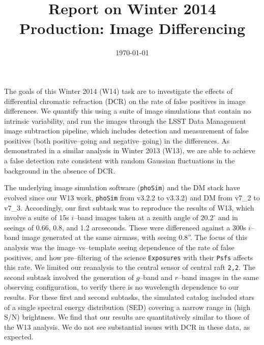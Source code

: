 \documentclass[prd, nofootinbib, floatfix, 11pt, tightenlines, times]{article}
\title{\vspace{-22mm} \Large{Report on Winter 2014 Production: Image Differencing} \vspace{-6mm}}
\date{\today}
\author{
}
\begin{document}
\maketitle

The goals of this Winter 2014 (W14) task are to investigate the
effects of differential chromatic refraction (DCR) on the rate of
false positives in image differences.  We quantify this using a suite
of image simulations that contain no intrinsic variability, and run
the images through the LSST Data Management image subtraction
pipeline, which includes detection and measurement of false positives
(both positive--going and negative--going) in the differences.  As
demonstrated in a similar analysis in Winter 2013 (W13), we are able
to achieve a false detection rate consistent with random Gaussian
fluctuations in the background in the absence of DCR.

The underlying image simulation software ({\tt phoSim}) and the DM
stack have evolved since our W13 work, {\tt phoSim} from v3.2.2 to
v3.3.2) and DM from v7\_2 to v7\_3.  Accordingly, our first subtask
was to reproduce the results of W13, which involve a suite of 15s
$i$--band images taken at a zenith angle of $20.2^{\circ}$ and in
seeings of 0.66, 0.8, and 1.2 arcseconds.  These were differenced
against a 300s $i$--band image generated at the same airmass, with
seeing 0.8''.  The focus of this analysis was the image--vs--template
seeing dependence of the rate of false positives, and how
pre--filtering of the science {\tt Exposures} with their {\tt Psfs}
affects this rate.  We limited our reanalysis to the central sensor of
central raft {\tt 2,2}.  The second subtask involved the generation of
$g$--band and $r$--band images in the same observing configuration, to
verify there is no wavelength dependence to our results.  For these
first and second subtasks, the simulated catalog included stars of a
single spectral energy distribution (SED) covering a narrow range in
(high S/N) brightness.  We find that our results are quantitatively
similar to those of the W13 analysis.  We do not see substantial
issues with DCR in these data, as expected.
\end{document}
